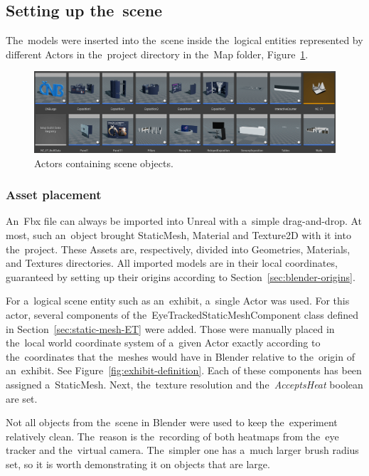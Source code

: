 \subsection{Setting up the~scene}
The~models were inserted into the~scene inside the~logical entities represented by different Actors in the~project directory in the~Map folder, Figure~\ref{fig:cnb-scene-contents}.

\begin{figure}[!ht]\centering
    \includegraphics[width=\textwidth]{img/cnb-scene-contents.png}
    \caption{Actors containing scene objects.}
    \label{fig:cnb-scene-contents}
\end{figure}

\subsubsection*{Asset placement}
An~Fbx file can always be imported into Unreal with a~simple drag-and-drop. At most, such an~object brought StaticMesh, Material and Texture2D with it into the~project. These Assets are, respectively, divided into Geometries, Materials, and Textures directories. All imported models are in their local coordinates, guaranteed by setting up their origins according to Section~\ref{sec:blender-origins}.

For a~logical scene entity such as an~exhibit, a~single Actor was used. For this actor, several components of the~EyeTrackedStaticMeshComponent class defined in Section~\ref{sec:static-mesh-ET} were added. Those were manually placed in the~local world coordinate system of a~given Actor exactly according to the~coordinates that the~meshes would have in Blender relative to the~origin of an~exhibit. See Figure~\ref{fig:exhibit-definition}.
Each of these components has been assigned a~StaticMesh. Next, the~texture resolution and the~\emph{AcceptsHeat} boolean are set.

Not all objects from the~scene in Blender were used to keep the~experiment relatively clean. The~reason is the~recording of both heatmaps from the~eye tracker and the~virtual camera. The~simpler one has a~much larger brush radius set, so it is worth demonstrating it on objects that are large.

